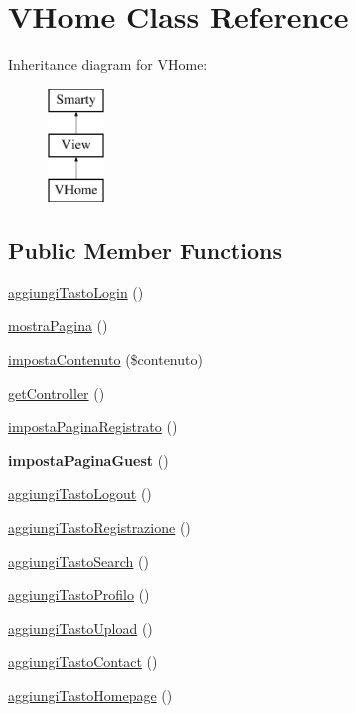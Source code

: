 \hypertarget{class_v_home}{}\section{V\+Home Class Reference}
\label{class_v_home}
Inheritance diagram for V\+Home\+:\begin{figure}[H]
\begin{center}
\leavevmode
\includegraphics[height=3.000000cm]{class_v_home}
\end{center}
\end{figure}
\subsection*{Public Member Functions}
\begin{DoxyCompactItemize}
\item 
\mbox{\hyperlink{class_v_home_a9f4f529088918cace57553a3db123152}{aggiungi\+Tasto\+Login}} ()
\item 
\mbox{\hyperlink{class_v_home_a46759d4232bd0607baff37daa710b4fb}{mostra\+Pagina}} ()
\item 
\mbox{\hyperlink{class_v_home_adc521709c98ca1fed92db3923c3d5b55}{imposta\+Contenuto}} (\$contenuto)
\item 
\mbox{\hyperlink{class_v_home_aa8b89e0bad51878addc1300cd3e95b5c}{get\+Controller}} ()
\item 
\mbox{\hyperlink{class_v_home_a19d02ab00682bacf312e22ad6494ceec}{imposta\+Pagina\+Registrato}} ()
\item 
\mbox{\label{class_v_home_a77cc3ecaf9ae5edd3da59a6c33a4ef15}} 
{\bfseries imposta\+Pagina\+Guest} ()
\item 
\mbox{\hyperlink{class_v_home_ab0039ca5d1d52ecb682381ccf49e3c9d}{aggiungi\+Tasto\+Logout}} ()
\item 
\mbox{\hyperlink{class_v_home_aa92baf7c9b82fe4d08c7cbc2328a84c1}{aggiungi\+Tasto\+Registrazione}} ()
\item 
\mbox{\hyperlink{class_v_home_a0e650bd9db71247a3bdcc37e1b9cca07}{aggiungi\+Tasto\+Search}} ()
\item 
\mbox{\hyperlink{class_v_home_a5944d155e8ff034c8bd1b1b2c50538eb}{aggiungi\+Tasto\+Profilo}} ()
\item 
\mbox{\hyperlink{class_v_home_ab9f05cc1c0334345d8bf05de0f427a8c}{aggiungi\+Tasto\+Upload}} ()
\item 
\mbox{\hyperlink{class_v_home_ac03aa54c6001e57b53284e6ddc21ffcf}{aggiungi\+Tasto\+Contact}} ()
\item 
\mbox{\hyperlink{class_v_home_a72f16e9d9862a548b2669c6f1f28c7e7}{aggiungi\+Tasto\+Homepage}} ()
\end{DoxyCompactItemize}
